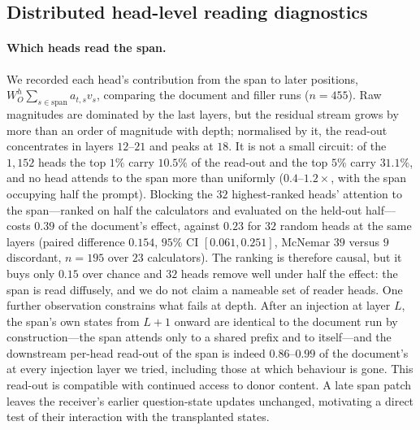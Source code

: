 \subsection{Distributed head-level reading diagnostics}
\label{app:readerdiagnostics}
\paragraph{Which heads read the span.} We recorded each head's contribution
from the span to later positions,
$W_O^h \sum_{s \in \text{span}} a_{t,s} v_s$, comparing the
document and filler runs ($n=455$). Raw magnitudes are dominated by the last
layers, but the residual stream grows by more than an order of magnitude with
depth; normalised by it, the read-out concentrates in layers $12$--$21$ and
peaks at $18$. It is not a small circuit: of the $1{,}152$ heads the top $1\%$
carry $10.5\%$ of the read-out and the top $5\%$ carry $31.1\%$, and no head
attends to the span more than uniformly ($0.4$--$1.2\times$, with the span
occupying half the prompt). Blocking the $32$ highest-ranked heads' attention to
the span---ranked on half the calculators and evaluated on the held-out
half---costs $0.39$ of the document's effect, against $0.23$ for $32$ random
heads at the same layers (paired difference $0.154$, $95\%$ CI $[0.061,0.251]$,
McNemar $39$ versus $9$ discordant, $n=195$ over $23$ calculators). The ranking
is therefore causal, but it buys only $0.15$ over chance and $32$ heads remove
well under half the effect: the span is read diffusely, and we do not claim a
nameable set of reader heads. One further observation constrains what fails at
depth. After an injection at layer $L$, the span's own states from $L+1$ onward
are identical to the document run by construction---the span attends only to a
shared prefix and to itself---and the downstream per-head read-out of the span
is indeed $0.86$--$0.99$ of the document's at every injection layer we tried,
including those at which behaviour is gone. This read-out is compatible with continued access to donor content. A late
span patch leaves the receiver's earlier question-state updates unchanged,
motivating a direct test of their interaction with the transplanted states.

